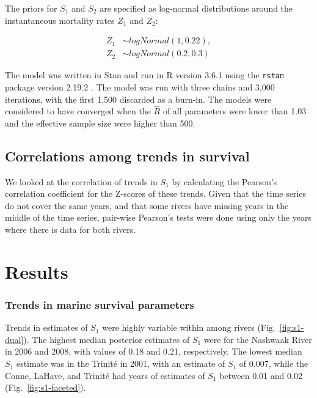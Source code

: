 \documentclass[12pt]{article}
\newcommand{\So}{$S_{1}$\xspace}
\newcommand{\St}{$S_{2}$\xspace}
\newcommand{\comment}[1]{\par {\bfseries \color{blue} #1 \par}} %
\begin{document}
The priors for \So and \St are specified as log-normal distributions around
the instantaneous mortality rates $Z_1$ and $Z_2$:

\begin{align}
Z_1 &\sim logNormal(1, 0.22),   \\ 
Z_2 &\sim logNormal(0.2, 0.3)
\end{align}

The model was written in Stan \citep{Carpenter2017} and run in R version 3.6.1
\citep{RCoreTeam2019} using the \texttt{rstan} package version 2.19.2
\citep{StanDevelopmentTeam2019}.
The model was run with three chains and 3,000 iterations, with the first 1,500
discarded as a burn-in. The models were considered to have converged when the
$\hat R$ of all parameters were lower than 1.03 and the effective sample size 
were higher than 500.

\subsection*{Correlations among trends in survival}


We looked at the correlation of trends in \So by calculating the Pearson's
correlation coefficient for the Z-scores of these trends. Given that the time
series do not cover the same years, and that some rivers have missing years in
the middle of the time series, pair-wise Pearson's tests were done using only
the years where there is data for both rivers.

\section*{Results}


\subsubsection*{Trends in marine survival parameters}

Trends in estimates of \So were highly variable within among rivers
(Fig.~\ref{fig:s1-dual}). The highest median posterior estimates of \So
were for the Nashwaak River in 2006 and 2008, with values of 0.18 and 0.21,
respectively. The lowest median \So estimate was in the Trinit\'{e} in 2001,
with an estimate of \So of 0.007, while the Conne, LaHave, and Trinit\'{e} had
years of estimates of \So between 0.01 and 0.02 (Fig.~\ref{fig:s1-faceted}).
\end{document}
